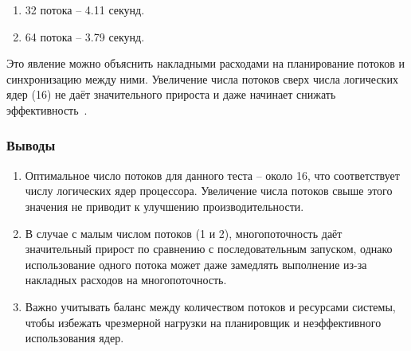 \begin{enumerate}
    \item 32 потока – 4.11 секунд.
    \item 64 потока – 3.79 секунд.
\end{enumerate}

Это явление можно объяснить накладными расходами на планирование потоков и синхронизацию между ними. Увеличение числа потоков сверх числа логических ядер (16) не даёт значительного прироста и даже начинает снижать эффективность~\cite{silberschatz}.

\subsubsection*{Выводы}

\begin{enumerate}
    \item Оптимальное число потоков для данного теста – около 16, что соответствует числу логических ядер процессора. Увеличение числа потоков свыше этого значения не приводит к улучшению производительности.
    \item В случае с малым числом потоков (1 и 2), многопоточность даёт значительный прирост по сравнению с последовательным запуском, однако использование одного потока может даже замедлять выполнение из-за накладных расходов на многопоточность.
    \item Важно учитывать баланс между количеством потоков и ресурсами системы, чтобы избежать чрезмерной нагрузки на планировщик и неэффективного использования ядер.
\end{enumerate}